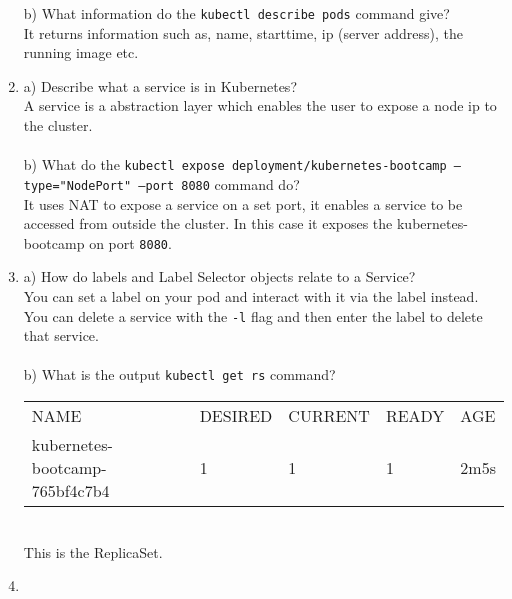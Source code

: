 \documentclass{article}
\begin{document}
\begin{enumerate}
        b) What information do the \texttt{kubectl describe pods} command give? \\
        It returns information such as, name, starttime, ip (server address), the running image etc.
        \item a) Describe what a service is in Kubernetes? \\
        A service is a abstraction layer which enables the user to expose a node ip to the cluster. 
        \\\\
        b) What do the \texttt{kubectl expose deployment/kubernetes-bootcamp --type="NodePort" --port 8080} command do? \\
        It uses NAT to expose a service on a set port, it enables a service to be accessed from outside
        the cluster. In this case it exposes the kubernetes-bootcamp on port \texttt{8080}.
        \item a) How do labels and Label Selector objects relate to a Service? \\
        You can set a label on your pod and interact with it via the label instead. You can delete a service with the 
        \texttt{-l} flag and then enter the label to delete that service.
        \\\\
        b) What is the output \texttt{kubectl get rs} command?\\
        \begin{tabular}{lllll}
            NAME & DESIRED & CURRENT & READY & AGE \\
            kubernetes-bootcamp-765bf4c7b4 & 1 & 1 & 1 & 2m5s
        \end{tabular}
        \\
        This is the ReplicaSet.
        \item 
    \end{enumerate}
\end{document}
